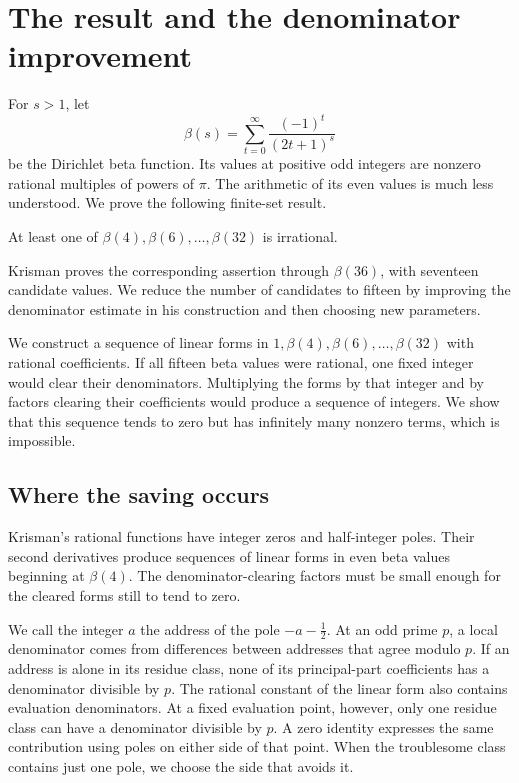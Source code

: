 \section{The result and the denominator improvement}\label{sec:introduction}
For $s>1$, let
\[
 \beta(s)=\sum_{t=0}^{\infty}\frac{(-1)^t}{(2t+1)^s}
\]
be the Dirichlet beta function. Its values at positive odd integers are
nonzero rational multiples of powers of $\pi$. The arithmetic of its
even values is much less understood. We prove the following finite-set
result.

\begin{theorem}\label{thm:main}
At least one of $\beta(4),\beta(6),\ldots,\beta(32)$ is irrational.
\end{theorem}

Krisman \cite[Theorem 1.1]{krisman} proves the corresponding assertion
through $\beta(36)$, with seventeen candidate values. We reduce the
number of candidates to fifteen by improving the denominator estimate
in his construction and then choosing new parameters.

We construct a sequence of linear forms in
$1,\beta(4),\beta(6),\ldots,\beta(32)$ with rational coefficients.
If all fifteen beta values were rational, one fixed integer would
clear their denominators. Multiplying the forms by that integer and
by factors clearing their coefficients would produce a sequence of
integers. We show that this sequence tends to zero but has infinitely
many nonzero terms, which is impossible.

\subsection{Where the saving occurs}
Krisman's rational functions have integer zeros and half-integer poles.
Their second derivatives produce sequences of linear forms in even
beta values beginning at $\beta(4)$. The denominator-clearing factors
must be small enough for the cleared forms still to tend to zero.

We call the integer $a$ the address of the pole $-a-\tfrac12$.
At an odd prime $p$, a local denominator comes from differences between
addresses that agree modulo $p$. If an address is alone in its residue
class, none of its principal-part coefficients has a denominator divisible
by $p$.
The rational constant of the linear form also contains evaluation
denominators. At a fixed evaluation point, however, only one residue
class can have a denominator divisible by $p$. A zero identity expresses
the same contribution using poles on either side of that point. When
the troublesome class contains just one pole, we choose the side that
avoids it.


